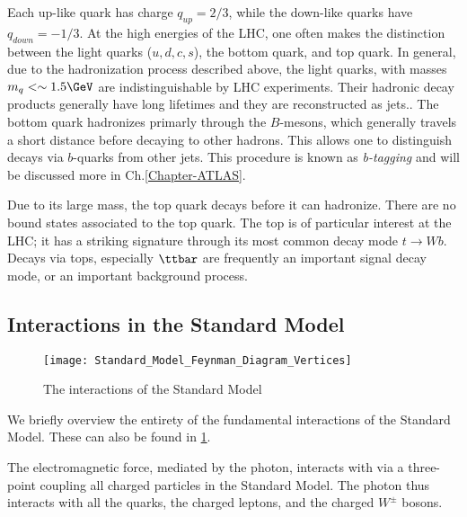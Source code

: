 Each up-like quark has charge $q_{up} = 2/3$, while the down-like quarks have $q_{down} = -1/3$.
At the high energies of the LHC, one often makes the distinction between the light quarks ($u,d,c,s$), the bottom quark, and top quark.
In general, due to the hadronization process described above, the light quarks, with masses $m_q <\order 1.5 \GeV$ are indistinguishable by LHC experiments.
Their hadronic decay products generally have long lifetimes and they are reconstructed as jets.\footnotemark.
The bottom quark hadronizes primarly through the $B$-mesons, which generally travels a short distance before decaying to other hadrons.
This allows one to distinguish decays via $b$-quarks from other jets.
This procedure is known as \textit{b-tagging} and will be discussed more in Ch.\ref{Chapter-ATLAS}.

Due to its large mass, the top quark decays before it can hadronize.
There are no bound states associated to the top quark.
The top is of particular interest at the LHC; it has a striking signature through its most common decay mode $t \rightarrow Wb$.
Decays via tops, especially $\ttbar$ are frequently an important signal decay mode, or an important background process.

\subsection{Interactions in the Standard Model}
\begin{figure}
\caption{The interactions of the Standard Model} \label{fig:sm_interactions}
\texttt{[image: Standard\_Model\_Feynman\_Diagram\_Vertices]}
\end{figure}

We briefly overview the entirety of the fundamental interactions of the Standard Model.
These can also be found in \ref{fig:sm_interactions}.

The electromagnetic force, mediated by the photon, interacts with via a three-point coupling all charged particles in the Standard Model.
The photon thus interacts with all the quarks, the charged leptons, and the charged $W^\pm$ bosons.

